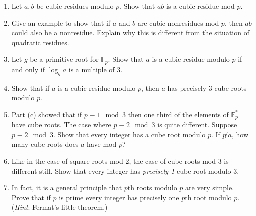 \documentclass[11pt]{article}
\newcommand{\bF}{\mathbb{F}}
\begin{document}
\begin{enumerate}
{\begin{enumerate}
    \item{
    Let $a,b$ be cubic residues modulo $p$.  Show that $ab$ is a cubic residue mod $p$.
    }
    \item{
    Give an example to show that if $a$ and $b$ are cubic nonresidues mod $p$, then $ab$ could also be a nonresidue.  Explain why this is different from the situation of quadratic residues.
    }
    \item{
    Let $g$ be a primitive root for $\bF_p$.  Show that $a$ is a cubic residue modulo $p$ if and only if $\log_g a$ is a multiple of 3.
    }
    \item{
    Show that if $a$ is a cubic residue modulo $p$, then $a$ has precisely 3 cube roots modulo $p$.
    }
    \item{
    Part (c) showed that if $p\equiv 1\mod 3$ then one third of the elements of $\bF_p^*$ have cube roots.  The case where $p\equiv 2\mod 3$ is quite different.  Suppose $p\equiv 2\mod 3$.  Show that every integer has a cube root modulo $p$.  If $p\not|a$, how many cube roots does $a$ have mod $p$?
    }
    \item{
    Like in the case of square roots mod 2, the case of cube roots mod 3 is different still.  Show that every integer has \textit{precisely 1} cube root modulo 3.
    }
    \item{
    In fact, it is a general principle that $p$th roots modulo $p$ are very simple.  Prove that if $p$ is prime every integer has precisely one $p$th root modulo $p$.  (\textit{Hint}: Fermat's little theorem.)
    }
  \end{enumerate}
  }
\end{enumerate}
\end{document}
